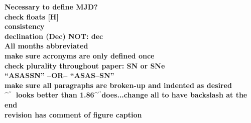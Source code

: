 \documentclass[aps,prb,twocolumn,superscriptaddress]{revtex4-1}
\def\arcsec{\ifmmode^{\prime\prime}\else$^{\prime\prime}$\fi}
\begin{document}
\begin{widetext}
 {\bf Necessary to define MJD?}\\
 {\bf check floats [H]}\\
 {\bf \noindent consistency\\
 \indent declination (Dec) NOT: dec\\
 \indent All months abbreviated\\
 \indent make sure acronyms are only defined once\\
 \indent check plurality throughout paper: SN or SNe\\
 \indent ``ASASSN'' --OR-- ``ASAS--SN''\\
 \indent make sure all paragraphs are broken-up and indented as desired\\
 \arcsec\ looks better than 1.86\arcsec does...change all to have backslash at the end\\
 }
 {\bf revision has comment of figure caption\\}
\end{widetext}

%

\setlength{\parindent}{0cm}



\end{document}
